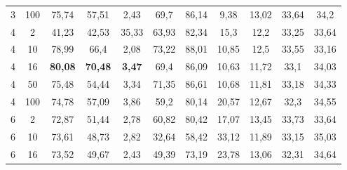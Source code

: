 \begin{table}[ht]
\begin{tabular}{cc|ccc|ccc|ccc}
        {3}                           & {100}  & {75,74}                             & {57,51}                             & {2,43}                                   & {69,7}           & {86,14}          & {9,38}          & {13,02}      & {33,64}     & {34,2}      \\
        {4}                           & {2}    & {41,23}                             & {42,53}                             & {35,33}                                  & {63,93}          & {82,34}          & {15,3}          & {12,2}       & {33,25}     & {33,64}     \\
        {4}                           & {10}   & {78,99}                             & {66,4}                              & {2,08}                                   & {73,22}          & {88,01}          & {10,85}         & {12,5}       & {33,55}     & {33,16}     \\
        {4}                           & {16}   & {\textbf{80,08}}                    & {\textbf{70,48}}                    & {\textbf{3,47}}                          & {69,4}           & {86,09}          & {10,63}         & {11,72}      & {33,1}      & {34,03}     \\
        {4}                           & {50}   & {75,48}                             & {54,44}                             & {3,34}                                   & {71,35}          & {86,61}          & {10,68}         & {11,81}      & {33,18}     & {34,33}     \\
        {4}                           & {100}  & {74,78}                             & {57,09}                             & {3,86}                                   & {59,2}           & {80,14}          & {20,57}         & {12,67}      & {32,3}      & {34,55}     \\
        {6}                           & {2}    & {72,87}                             & {51,44}                             & {2,78}                                   & {60,82}          & {80,42}          & {17,07}         & {13,45}      & {33,73}     & {33,64}     \\
        {6}                           & {10}   & {73,61}                             & {48,73}                             & {2,82}                                   & {32,64}          & {58,42}          & {33,12}         & {11,89}      & {33,15}     & {35,03}     \\
        {6}                           & {16}   & {73,52}                             & {49,67}                             & {2,43}                                   & {49,39}          & {73,19}          & {23,78}         & {13,06}      & {32,31}     & {34,64}     \\

\end{tabular}
\end{table}
